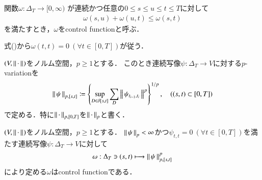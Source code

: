 	\begin{screen}
		\begin{dfn}
			関数$\omega:\Delta_T \longrightarrow [0,\infty)$
			が連続かつ任意の$0 \leq s \leq u \leq t \leq T$に対して
			\begin{align}
				\omega(s,u) + \omega(u,t) \leq \omega(s,t)
				\label{eq:control_function_subadditivity}
			\end{align}
			を満たすとき，$\omega$をcontrol functionと呼ぶ．
		\end{dfn}
	\end{screen}
	
	式()から$\omega(t,t)=0\ (\forall t \in [0,T])$が従う．
	
	\begin{screen}
		\begin{dfn}
			$(V,\left\|\, \cdot\, \right\|_{})$をノルム空間，$p \geq 1$とする．
			このとき連続写像$\psi:\Delta_T \longrightarrow V$に対する$p$-variationを
			\begin{align}
				\left\|\, \psi\, \right\|_{p,[s,t]}
				\coloneqq \left\{ \operatorname*{sup}_{D \in \delta[s,t]}  \sum_D \left\|\, \psi_{t_{i-1},t_i}\, \right\|_{}^p \right\}^{1/p},
				\quad ((s,t) \subset [0,T])
			\end{align}
			で定める．特に$\left\|\, \cdot\, \right\|_{p,[0,T]}$を$\left\|\, \cdot\, \right\|_{p}$と書く．
		\end{dfn}
	\end{screen}
	
	\begin{screen}
		\begin{thm}
			$(V,\left\|\, \cdot\, \right\|_{})$をノルム空間，$p \geq 1$とする．
			$\left\|\, \psi\, \right\|_{p} < \infty$かつ$\psi_{t,t} = 0\ (\forall t \in [0,T])$を満たす連続写像$\psi:\Delta_T \longrightarrow V$に対して
			\begin{align}
				\omega:\Delta_T \ni (s,t) \longmapsto \left\|\, \psi\, \right\|_{p,[s,t]}^p
			\end{align}
			により定める$\omega$はcontrol functionである．
		\end{thm}
	\end{screen}
	
